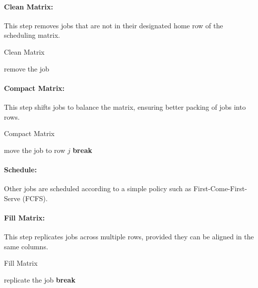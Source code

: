 \documentclass[12pt]{book}
\begin{document}
\paragraph{Clean Matrix:}  
This step removes jobs that are not in their designated home row of the scheduling matrix.
\begin{algorithm}[H]
\caption{Clean Matrix}
\begin{algorithmic}[1]
            \State remove the job
        \EndIf
    \EndFor
\EndFor
\end{algorithmic}
\end{algorithm}

\paragraph{Compact Matrix:}  
This step shifts jobs to balance the matrix, ensuring better packing of jobs into rows.
\begin{algorithm}[H]
\caption{Compact Matrix}
\begin{algorithmic}[1]
\Repeat
                    \State move the job to row $j$
                    \State \textbf{break}
                \EndIf
            \EndFor
        \EndFor
    \EndFor
{}
\end{algorithmic}
\end{algorithm}

\paragraph{Schedule:}  
Other jobs are scheduled according to a simple policy such as First-Come-First-Serve (FCFS).

\paragraph{Fill Matrix:}  
This step replicates jobs across multiple rows, provided they can be aligned in the same columns.
\begin{algorithm}[H]
\caption{Fill Matrix}
\begin{algorithmic}[1]
\Repeat
                \State replicate the job
                \State \textbf{break}
            \EndIf
        \EndFor
    \EndFor
{}
\end{algorithmic}
\end{algorithm}
\end{document}
